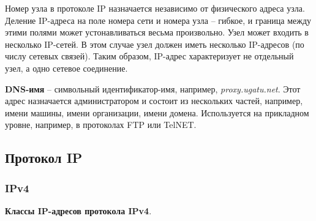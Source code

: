 \documentclass[a4paper]{article}
\begin{document}
Номер узла в протоколе IP назначается независимо от физического адреса узла. Деление IP-адреса на поле номера сети и номера узла -- гибкое, и граница между этими полями может устонавливаться весьма произвольно. Узел может входить в несколько IP-сетей. В этом случае узел должен иметь несколько IP-адресов (по числу сетевых связей). Таким образом, IP-адрес характеризует не отдельный узел, а одно сетевое соединение.

\textbf{DNS-имя} -- символьный идентификатор-имя, например, \emph{proxy.ugatu.net}. Этот адрес назначается администратором и состоит из нескольких частей, например, имени машины, имени организации, имени домена. Используется на прикладном уровне, например, в протоколах FTP или TelNET.

\subsection{Протокол IP}

	\subsubsection{IPv4}

		\textbf{Классы IP-адресов протокола IPv4}.
\end{document}
